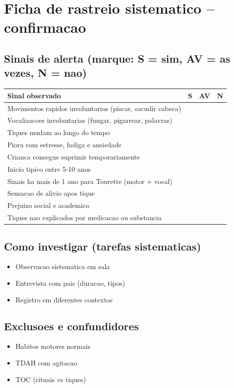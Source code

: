 \documentclass[a4paper,11pt]{book}
\begin{document}
\section*{Ficha de rastreio sistematico -- confirmacao}
\subsection*{Sinais de alerta (marque: S = sim, AV = as vezes, N = nao)}
\begin{tabular}{@{}p{11.5cm}ccc@{}}\toprule
Sinal observado & S & AV & N \\\midrule
Movimentos rapidos involuntarios (piscar, sacudir cabeca) & & & \\
Vocalizacoes involuntarias (fungar, pigarrear, palavras) & & & \\
Tiques mudam ao longo do tempo & & & \\
Piora com estresse, fadiga e ansiedade & & & \\
Crianca consegue suprimir temporariamente & & & \\
Inicio tipico entre 5-10 anos & & & \\
Sinais ha mais de 1 ano para Tourette (motor + vocal) & & & \\
Sensacao de alivio apos tique & & & \\
Prejuizo social e academico & & & \\
Tiques nao explicados por medicacao ou substancia & & & \\
\bottomrule\end{tabular}
\subsection*{Como investigar (tarefas sistematicas)}
\begin{itemize}
\item Observacao sistematica em sala
\item Entrevista com pais (duracao, tipos)
\item Registro em diferentes contextos
\end{itemize}
\subsection*{Exclusoes e confundidores}
\begin{itemize}
\item Habitos motores normais
\item TDAH com agitacao
\item TOC (rituais vs tiques)
\end{itemize}
\end{document}
